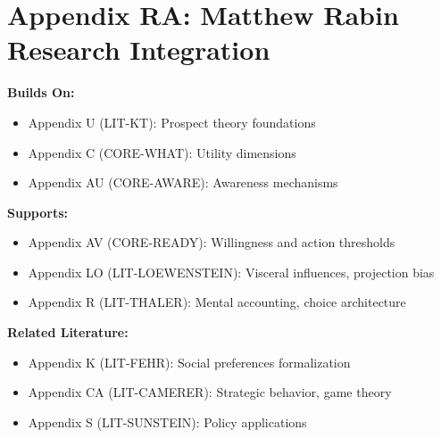 
\chapter*{Appendix RA: Matthew Rabin Research Integration}
\label{app:rabin}

\begin{tcolorbox}[colback=blue!5!white,colframe=blue!75!black,title=Cross-Reference Map]
\textbf{Builds On:}
\begin{itemize}
    \item Appendix U (LIT-KT): Prospect theory foundations
    \item Appendix C (CORE-WHAT): Utility dimensions
    \item Appendix AU (CORE-AWARE): Awareness mechanisms
\end{itemize}

\textbf{Supports:}
\begin{itemize}
    \item Appendix AV (CORE-READY): Willingness and action thresholds
    \item Appendix LO (LIT-LOEWENSTEIN): Visceral influences, projection bias
    \item Appendix R (LIT-THALER): Mental accounting, choice architecture
\end{itemize}

\textbf{Related Literature:}
\begin{itemize}
    \item Appendix K (LIT-FEHR): Social preferences formalization
    \item Appendix CA (LIT-CAMERER): Strategic behavior, game theory
    \item Appendix S (LIT-SUNSTEIN): Policy applications
\end{itemize}
\end{tcolorbox}

